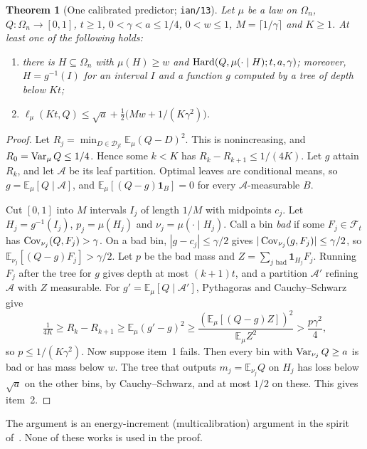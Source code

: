 \documentclass[11pt]{article}
\newtheorem{theorem}{Theorem}[section]
\theoremstyle{definition}\newtheorem{definition}[theorem]{Definition}
\theoremstyle{remark}\newtheorem{remark}[theorem]{Remark}
\newcommand{\E}{\mathbb E}\newcommand{\Prb}{\mathbb P}
\newcommand{\mc}{\mathcal}\newcommand{\eps}{\varepsilon}
\begin{document}
\begin{theorem}[One calibrated predictor; \texttt{ian/13}]\label{dist:regularity}
Let \(\mu\) be a law on \(\Omega_n\), \(Q:\Omega_n\to[0,1]\), \(t\ge1\),
\(0<\gamma<a\le1/4\), \(0<w\le1\), \(M=\lceil1/\gamma\rceil\) and \(K\ge1\). At
least one of the following holds:
\begin{enumerate}
\item there is \(H\subseteq\Omega_n\) with \(\mu(H)\ge w\) and
\(\operatorname{Hard}(Q,\mu(\cdot\mid H);t,a,\gamma)\); moreover, \(H=g^{-1}(I)\) for an
interval \(I\) and a function \(g\) computed by a tree of depth below \(Kt\);
\item \(\ell_\mu(Kt,Q)\le\sqrt a+\tfrac12\bigl(Mw+1/(K\gamma^2)\bigr)\).
\end{enumerate}
\end{theorem}
\begin{proof}
Let \(R_j=\min_{D\in\mc D_{jt}}\E_\mu(Q-D)^2\). This is nonincreasing, and
\(R_0=\operatorname{Var}_\mu Q\le1/4\). Hence some \(k<K\) has \(R_k-R_{k+1}\le1/(4K)\). Let
\(g\) attain \(R_k\), and let \(\mc A\) be its leaf partition. Optimal leaves
are conditional means, so \(g=\E_\mu[Q\mid\mc A]\), and
\(\E_\mu[(Q-g)\mathbf 1_B]=0\) for every \(\mc A\)-measurable \(B\).

Cut \([0,1]\) into \(M\) intervals \(I_j\) of length \(1/M\) with midpoints
\(c_j\). Let \(H_j=g^{-1}(I_j)\), \(p_j=\mu(H_j)\) and
\(\nu_j=\mu(\cdot\mid H_j)\). Call a bin \emph{bad} if some
\(F_j\in\mc F_t\) has \(\operatorname{Cov}_{\nu_j}(Q,F_j)>\gamma\). On a bad bin,
\(|g-c_j|\le\gamma/2\) gives \(|\operatorname{Cov}_{\nu_j}(g,F_j)|\le\gamma/2\), so
\(\E_{\nu_j}[(Q-g)F_j]>\gamma/2\). Let \(p\) be the bad mass and
\(Z=\sum_{j\text{ bad}}\mathbf 1_{H_j}F_j\). Running \(F_j\) after the tree for
\(g\) gives depth at most \((k+1)t\), and a partition \(\mc A'\) refining \(\mc A\)
with \(Z\) measurable. For \(g'=\E_\mu[Q\mid\mc A']\), Pythagoras and
Cauchy--Schwarz give
\[
 \tfrac1{4K}\ge R_k-R_{k+1}\ge\E_\mu(g'-g)^2
 \ge\frac{(\E_\mu[(Q-g)Z])^2}{\E_\mu Z^2}>\frac{p\gamma^2}{4},
\]
so \(p\le1/(K\gamma^2)\). Now suppose item~1 fails. Then every bin with
\(\operatorname{Var}_{\nu_j}Q\ge a\) is bad or has mass below \(w\). The tree that outputs
\(m_j=\E_{\nu_j}Q\) on \(H_j\) has loss below \(\sqrt a\) on the other bins, by
Cauchy--Schwarz, and at most \(1/2\) on these. This gives item~2.
\end{proof}
The argument is an energy-increment (multicalibration) argument in the spirit
of~\cite{TTV09,HKRR18,CDV24}. None of these works is used in the proof.
\end{document}
